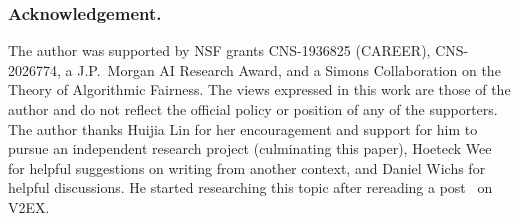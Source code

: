 \subsubsection{Acknowledgement.}
The author was supported by NSF grants CNS-1936825 (CAREER), CNS-2026774, a J.P.~Morgan AI Research Award, and a Simons Collaboration on the Theory of Algorithmic Fairness.
The views expressed in this work are those of the author and do not reflect the official policy or position of any of the supporters.
The author thanks Huijia Lin for her encouragement and support
for him to pursue an independent research project (culminating this paper),
Hoeteck Wee for helpful suggestions on writing from another context,
and Daniel Wichs for helpful discussions.
He started researching this topic after rereading a post~\cite{V2EX:759538} on V2EX.
